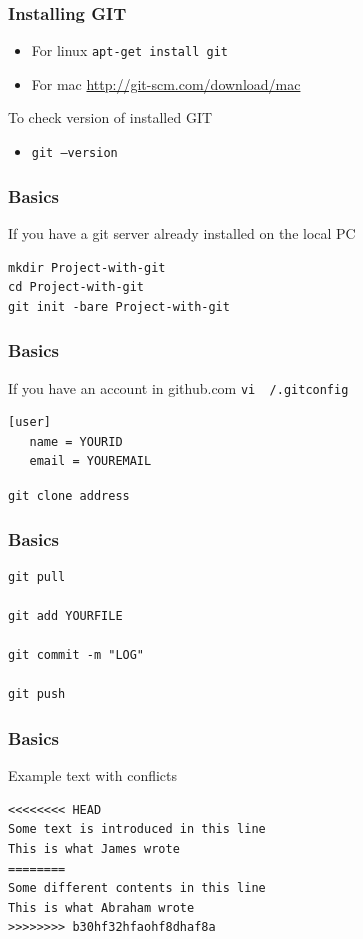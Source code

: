 \documentclass[newPxFont,sthlmFooter,nooffset]{beamer}
\begin{document}
\begin{frame}[t]
  \frametitle{Installing GIT}

  \begin{itemize}
  \item For linux        \texttt{apt-get install git}
  \item For mac         \url{http://git-scm.com/download/mac}
  \end{itemize}

To check version of installed GIT
\begin{itemize}
\item \texttt{git --version}
\end{itemize}
\end{frame}


\begin{frame}[fragile,t]
  \frametitle{Basics }
If you have a git server already installed on the local PC
\begin{verbatim}
mkdir Project-with-git
cd Project-with-git
git init -bare Project-with-git
\end{verbatim}


\end{frame}

\begin{frame}[fragile,t]
  \frametitle{Basics }

If you have an account in github.com
\texttt{vi ~/.gitconfig}
\begin{verbatim}
[user]
   name = YOURID
   email = YOUREMAIL
\end{verbatim}

\texttt{git clone address}
\end{frame}

\begin{frame}[fragile,t]
  \frametitle{Basics }
\begin{verbatim}
git pull

git add YOURFILE

git commit -m "LOG"

git push
\end{verbatim}
\end{frame}

\begin{frame}[fragile,t]
  \frametitle{Basics}
Example text with conflicts

\begin{verbatim}
<<<<<<<< HEAD
Some text is introduced in this line
This is what James wrote
========
Some different contents in this line
This is what Abraham wrote
>>>>>>>> b30hf32hfaohf8dhaf8a
\end{verbatim}
\end{frame}
\end{document}
